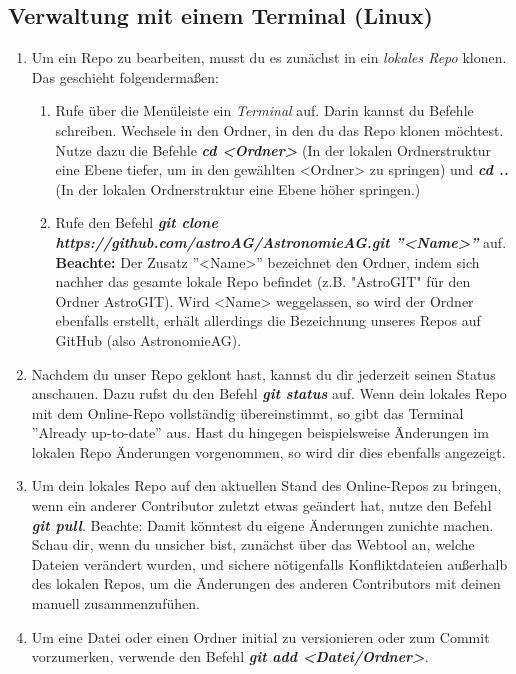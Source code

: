 \documentclass[12pt,a4paper,notitlepage,onecolumn,portrait,oneside, , , ]{scrartcl}
\begin{document}
\subsection{Verwaltung mit einem Terminal (Linux)}
\begin{enumerate}[label=\arabic*.]
\item Um ein Repo zu bearbeiten, musst du es zunächst in ein \textit{lokales Repo} klonen. Das geschieht folgendermaßen:
\begin{enumerate}[label=(\alph*)]
\item Rufe über die Menüleiste ein \textit{Terminal} auf. Darin kannst du Befehle schreiben. Wechsele in den Ordner, in den du das Repo klonen möchtest. Nutze dazu die Befehle \textbf{\textit{cd <Ordner>}} (In der lokalen Ordnerstruktur eine Ebene tiefer, um in den gewählten <Ordner> zu springen) und \textbf{\textit{cd ..}} (In der lokalen Ordnerstruktur eine Ebene höher springen.)
\item Rufe den Befehl \textbf{\textit{git clone https://github.com/astroAG/AstronomieAG.git ''<Name>''}} auf. \textbf{Beachte:} Der Zusatz ''<Name>'' bezeichnet den Ordner, indem sich nachher das gesamte lokale Repo befindet (z.B. "AstroGIT" für den Ordner AstroGIT). Wird <Name> weggelassen, so wird der Ordner ebenfalls erstellt, erhält allerdings die Bezeichnung unseres Repos auf GitHub (also AstronomieAG).
\end{enumerate}
\item Nachdem du unser Repo geklont hast, kannst du dir jederzeit seinen Status anschauen. Dazu rufst du den Befehl \textbf{\textit{git status}} auf. Wenn dein lokales Repo mit dem Online-Repo vollständig übereinstimmt, so  gibt das Terminal ''Already up-to-date'' aus. Hast du hingegen beispielsweise Änderungen im lokalen Repo Änderungen vorgenommen, so wird dir dies ebenfalls angezeigt.
\item Um dein lokales Repo auf den aktuellen Stand des Online-Repos zu bringen, wenn ein anderer Contributor zuletzt etwas geändert hat, nutze den Befehl \textbf{\textit{git pull}}. Beachte: Damit könntest du eigene Änderungen zunichte machen. Schau dir, wenn du unsicher bist, zunächst über das Webtool an, welche Dateien verändert wurden, und sichere nötigenfalls Konfliktdateien außerhalb des lokalen Repos, um die Änderungen des anderen Contributors mit deinen manuell zusammenzufühen.
\item Um eine Datei oder einen  Ordner initial zu versionieren oder zum Commit vorzumerken, verwende den Befehl \textbf{\textit{git add <Datei/Ordner>}}.

\end{enumerate}
\end{document}
